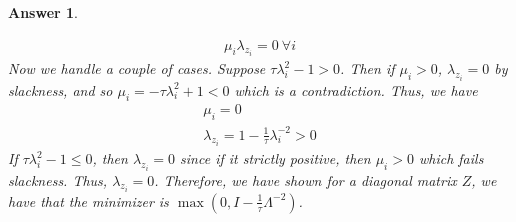 \documentclass[12pt]{article}
\theoremstyle{colon}
\newtheorem*{answer}{Answer}
\begin{document}
\begin{answer}
\begin{enumerate}[label=\arabic*)]
\begin{gather*}
        \mu_i \lambda_{z_i} = 0 \ \forall i
      \end{gather*}
      Now we handle a couple of cases. Suppose $\tau \lambda_i^2 - 1 > 0$. Then if $\mu_i > 0$, $\lambda_{z_i} = 0$ by slackness, and so $\mu_i = -\tau \lambda_i^2 + 1 < 0$ which is a contradiction. Thus, we have
      \begin{gather*}
        \mu_i = 0 \\
        \lambda_{z_i} = 1 - \frac{1}{\tau} \lambda_i^{-2} > 0
      \end{gather*}
      If $\tau \lambda_i^2 - 1 \leq 0$, then $\lambda_{z_i} = 0$ since if it strictly positive, then $\mu_i > 0$ which fails slackness. Thus, $\lambda_{z_i} = 0$. Therefore, we have shown for a diagonal matrix $Z$, we have that the minimizer is $\max (0, I - \frac{1}{\tau} \Lambda^{-2})$.


\end{enumerate}
\end{answer}
\end{document}

